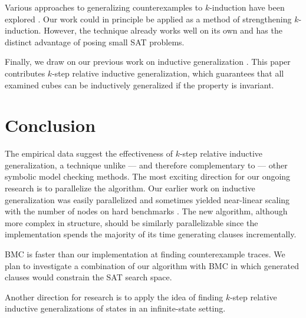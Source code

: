 \documentclass{llncs}
\begin{document}
Various approaches to generalizing counterexamples to $k$-induction
have been explored
\cite{DeMoura+Others/2003,Awedh+Others/2006,Vimjam+Others/2006}.  Our
work could in principle be applied as a method of strengthening
$k$-induction.  However, the technique already works well on its own
and has the distinct advantage of posing small SAT problems.

Finally, we draw on our previous work on inductive generalization
\cite{Bradley+Manna/2007}.  This paper contributes $k$-step relative
inductive generalization, which guarantees that all examined cubes can
be inductively generalized if the property is invariant.

\section{Conclusion}

The empirical data suggest the effectiveness of $k$-step relative
inductive generalization, a technique unlike --- and therefore
complementary to --- other symbolic model checking methods.  The most
exciting direction for our ongoing research is to parallelize the
algorithm.  Our earlier work on inductive generalization was easily
parallelized and sometimes yielded near-linear scaling with the number
of nodes on hard benchmarks \cite{Bradley/2007}.  The new algorithm,
although more complex in structure, should be similarly parallelizable
since the implementation spends the majority of its time generating
clauses incrementally.

BMC is faster than our implementation at finding counterexample
traces.  We plan to investigate a combination of our algorithm with
BMC in which generated clauses would constrain the SAT search space.

Another direction for research is to apply the idea of finding
$k$-step relative inductive generalizations of states in an
infinite-state setting.
\end{document}
